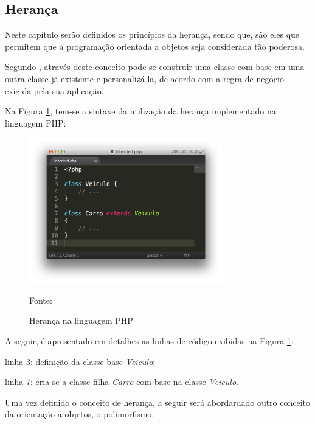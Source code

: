 \subsection{Herança}

Neste capítulo serão definidos os princípios da herança, sendo que, são eles que
permitem que a programação orientada a objetos seja considerada tão poderosa.

Segundo , através deste conceito pode-se
construir uma classe com base em uma outra classe já existente e personalizá-la,
de acordo com a regra de negócio exigida pela sua aplicação.

Na Figura \ref{fig:heranca}, tem-se a sintaxe da utilização da herança
implementado na linguagem \acs{PHP}:

\begin{figure}[h!tb]
	\caption{Herança na linguagem PHP}
	\label{fig:heranca}

	\centering
	\includegraphics[width=0.75\textwidth]{images/inherited.png}

	\centering
	\footnotesize Fonte: \fonteOAutor
\end{figure}

\FloatBarrier 	%

A seguir, é apresentado em detalhes as linhas de código exibidas na Figura
\ref{fig:heranca}:

\begin{alineas}
    \item linha 3: definição da classe base \textit{Veiculo};
    \item linha 7: cria-se a classe filha \textit{Carro} com base na classe
    \textit{Veiculo}.
\end{alineas}

Uma vez definido o conceito de herança, a seguir será abordardado outro conceito
da orientação a objetos, o polimorfismo.
